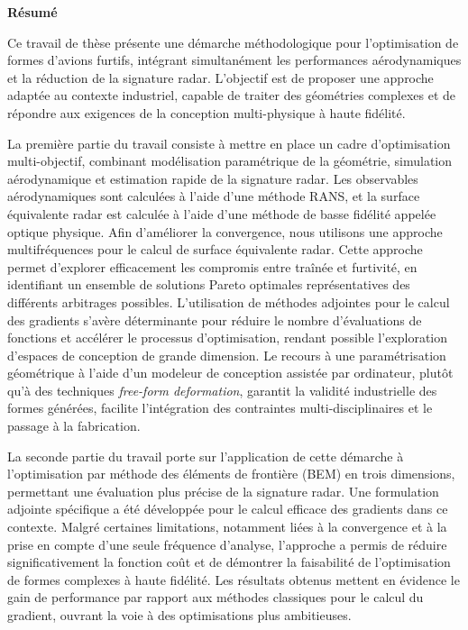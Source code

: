 \thispagestyle{plain}
{}
\begin{center}
    \Large
    \textbf{Résumé}
\end{center}

Ce travail de thèse présente une démarche méthodologique pour l'optimisation de formes d'avions furtifs, intégrant simultanément les performances aérodynamiques et la réduction de la signature radar. L'objectif est de proposer une approche adaptée au contexte industriel, capable de traiter des géométries complexes et de répondre aux exigences de la conception multi-physique à haute fidélité.

La première partie du travail consiste à mettre en place un cadre d'optimisation multi-objectif, combinant modélisation paramétrique de la géométrie, simulation aérodynamique et estimation rapide de la signature radar. Les observables aérodynamiques sont calculées à l'aide d'une méthode RANS, et la surface équivalente radar est calculée à l'aide d'une méthode de basse fidélité appelée optique physique. Afin d'améliorer la convergence, nous utilisons une approche multifréquences pour le calcul de surface équivalente radar. Cette approche permet d'explorer efficacement les compromis entre traînée et furtivité, en identifiant un ensemble de solutions Pareto optimales représentatives des différents arbitrages possibles. L'utilisation de méthodes adjointes pour le calcul des gradients s'avère déterminante pour réduire le nombre d'évaluations de fonctions et accélérer le processus d'optimisation, rendant possible l'exploration d'espaces de conception de grande dimension. Le recours à une paramétrisation géométrique à l'aide d'un modeleur de conception assistée par ordinateur, plutôt qu'à des techniques \textit{free-form deformation}, garantit la validité industrielle des formes générées,  facilite l'intégration des contraintes multi-disciplinaires et le passage à la fabrication.

La seconde partie du travail porte sur l'application de cette démarche à l'optimisation par méthode des éléments de frontière (BEM) en trois dimensions, permettant une évaluation plus précise de la signature radar. Une formulation adjointe spécifique a été développée pour le calcul efficace des gradients dans ce contexte. Malgré certaines limitations, notamment liées à la convergence et à la prise en compte d'une seule fréquence d'analyse, l'approche a permis de réduire significativement la fonction coût et de démontrer la faisabilité de l'optimisation de formes complexes à haute fidélité. Les résultats obtenus mettent en évidence le gain de performance par rapport aux méthodes classiques pour le calcul du gradient, ouvrant la voie à des optimisations plus ambitieuses.

